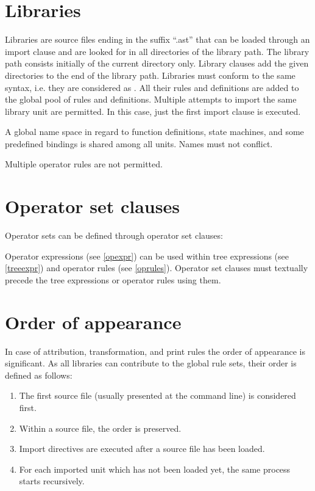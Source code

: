 \section{Libraries}

Libraries are source files ending in the suffix ``.ast'' that can
be loaded through an import clause and are looked for in all
directories of the library path. The library path consists initially
of the current directory only. Library clauses add the given directories
to the end of the library path. Libraries must conform to the
same syntax, i.e. they are considered as . All their
rules and definitions are added to the global pool of rules and definitions.
Multiple attempts to import the same library unit are permitted. In this
case, just the first import clause is executed.

A global name space in regard to function definitions, state machines,
and some predefined bindings is shared among all units. Names must not
conflict.

Multiple operator rules are not permitted.

\section{Operator set clauses}\label{opset}

Operator sets can be defined through operator set clauses:

\begin{grammar}
      \produces {} 
	 \lextoken{=}  \lextoken{;}
\end{grammar}

\noindent
Operator expressions (see \ref{opexpr}) can be used within
tree expressions (see \ref{treeexpr}) and operator rules
(see \ref{oprules}). Operator set clauses must textually precede the
tree expressions or operator rules using them.

\section{Order of appearance}

In case of attribution, transformation, and print rules the order
of appearance is significant. As all libraries can contribute to the
global rule sets, their order is defined as follows:

\begin{enumerate}
   \item The first source file (usually presented at the command line)
      is considered first.
   \item Within a source file, the order is preserved.
   \item Import directives are executed after a source file has been
      loaded.
   \item For each imported unit which has not been loaded yet, the
      same process starts recursively.
\end{enumerate}

